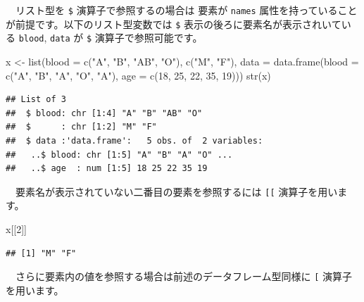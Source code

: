 \documentclass[
  12pt,
]{book}
\newenvironment{Shaded}{\begin{snugshade}}{\end{snugshade}}
\newcommand{\AttributeTok}[1]{\textcolor[rgb]{0.77,0.63,0.00}{#1}}
\newcommand{\DecValTok}[1]{\textcolor[rgb]{0.00,0.00,0.81}{#1}}
\newcommand{\FunctionTok}[1]{\textcolor[rgb]{0.00,0.00,0.00}{#1}}
\newcommand{\NormalTok}[1]{#1}
\newcommand{\OtherTok}[1]{\textcolor[rgb]{0.56,0.35,0.01}{#1}}
\newcommand{\SpecialCharTok}[1]{\textcolor[rgb]{0.00,0.00,0.00}{#1}}
\newcommand{\StringTok}[1]{\textcolor[rgb]{0.31,0.60,0.02}{#1}}
\begin{document}
　リスト型を \texttt{\$} 演算子で参照するの場合は 要素が \texttt{names} 属性を持っていることが前提です。以下のリスト型変数では \texttt{\$} 表示の後ろに要素名が表示されいている \texttt{blood}, \texttt{data} が \texttt{\$} 演算子で参照可能です。

\begin{Shaded}
\begin{Highlighting}[]
\NormalTok{x }\OtherTok{\textless{}{-}} \FunctionTok{list}\NormalTok{(}\AttributeTok{blood =} \FunctionTok{c}\NormalTok{(}\StringTok{"A"}\NormalTok{, }\StringTok{"B"}\NormalTok{, }\StringTok{"AB"}\NormalTok{, }\StringTok{"O"}\NormalTok{), }\FunctionTok{c}\NormalTok{(}\StringTok{"M"}\NormalTok{, }\StringTok{"F"}\NormalTok{),}
          \AttributeTok{data =} \FunctionTok{data.frame}\NormalTok{(}\AttributeTok{blood =} \FunctionTok{c}\NormalTok{(}\StringTok{"A"}\NormalTok{, }\StringTok{"B"}\NormalTok{, }\StringTok{"A"}\NormalTok{, }\StringTok{"O"}\NormalTok{, }\StringTok{"A"}\NormalTok{),}
                            \AttributeTok{age =} \FunctionTok{c}\NormalTok{(}\DecValTok{18}\NormalTok{, }\DecValTok{25}\NormalTok{, }\DecValTok{22}\NormalTok{, }\DecValTok{35}\NormalTok{, }\DecValTok{19}\NormalTok{)))}
\FunctionTok{str}\NormalTok{(x)}
\end{Highlighting}
\end{Shaded}

\begin{verbatim}
## List of 3
##  $ blood: chr [1:4] "A" "B" "AB" "O"
##  $      : chr [1:2] "M" "F"
##  $ data :'data.frame':   5 obs. of  2 variables:
##   ..$ blood: chr [1:5] "A" "B" "A" "O" ...
##   ..$ age  : num [1:5] 18 25 22 35 19
\end{verbatim}

　要素名が表示されていない二番目の要素を参照するには \texttt{{[}{[}} 演算子を用います。

\begin{Shaded}
\begin{Highlighting}[]
\NormalTok{x[[}\DecValTok{2}\NormalTok{]]}
\end{Highlighting}
\end{Shaded}

\begin{verbatim}
## [1] "M" "F"
\end{verbatim}

　さらに要素内の値を参照する場合は前述のデータフレーム型同様に \texttt{{[}} 演算子を用います。

\begin{Shaded}
\end{Shaded}
\end{document}
